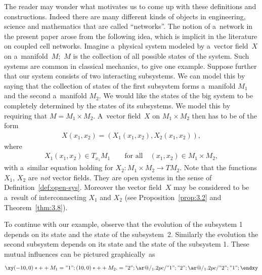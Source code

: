 \documentclass[10pt,a4paper]{amsart}
\numberwithin{equation}{section}
\begin{document}
The reader may wonder what motivates us to come up with these def\/initions and constructions.
Indeed there are many dif\/ferent kinds of objects in engineering, science and mathematics that are called ``networks''.
The notion of a~network in the present paper arose from the follo\-wing idea, which is implicit in the literature on
coupled cell networks.
Imagine a~physical system modeled by a~vector f\/ield~$X$ on a~manifold~$M$;~$M$ is the collection of all possible states
of the system.
Such systems are common in classical mechanics, to give one example.
Suppose further that our system consists of two interacting subsystems.
We can model this by saying that the collection of states of the f\/irst subsystem forms a~manifold $M_1$ and the second
a~manifold $M_2$.
We would like the states of the big system to be completely determined by the states of its subsystems.
We model this by requiring that $M = M_1 \times M_2$.
A~vector f\/ield~$X$ on $M_1\times M_2$ then has to be of the form
\begin{gather*}
X(x_1,x_2) = (X_1(x_1,x_2), X_2(x_1,x_2)),
\end{gather*}
where
\begin{gather*}
X_1(x_1,x_2) \in T_{x_1}M_1
\qquad
\text{for all}
\quad
(x_1,x_2)\in M_1\times M_2,
\end{gather*}
with a~similar equation holding for $X_2\colon M_1 \times M_2 \to TM_2$.
Note that the functions $X_1$, $X_2$ are {\em not} vector f\/ields.
They are open systems in the sense of Def\/inition~\ref{def:open-sys}.
Moreover the vector f\/ield~$X$ may be considered to be a~result of interconnecting $X_1$ and $X_2$ (see
Proposition~\ref{prop:3.2} and Theorem~\ref{thm:3.8}).

To continue with our example, observe that the evolution of the subsystem 1 depends on its state and the state of the subsystem~2.
Similarly the evolution the second subsystem depends on its state and the state of the subsystem 1.
These mutual inf\/luences can be pictured graphically~as
\begin{gather*}
\xy
(-10,0)*++{M_1}="1";
(10,0)*++{M_2.}="2";
{\ar@/_1.2pc/ "1";"2"};
{\ar@/_1.2pc/ "2";"1"};
\endxy
\end{gather*}
\end{document}
